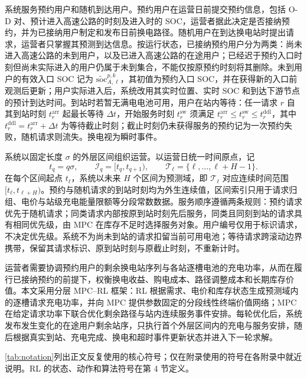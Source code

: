 \documentclass[12pt,a4paper,UTF8]{ctexart}
\begin{document}
系统服务预约用户和随机到达用户。预约用户在运营日前提交预约信息，包括 O-D 对、预计进入高速公路的时刻及进入时的 SOC，运营者据此决定是否接纳预约，并为已接纳用户制定和发布日前换电路径。随机用户在到达换电站时提出请求，运营者只掌握其预测到达信息。按运行状态，已接纳预约用户分为两类：尚未进入高速公路的未到用户，以及已进入高速公路的在途用户；已经迟于预约入口时刻但尚未实际进入的用户仍属于未到集合，不能仅按原预约时刻将其删除。未到用户的有效入口 SOC 记为 $\widetilde{\mathrm{soc}}_{A,\ell}^{p,k}$，其初值为预约入口 SOC，并在获得新的入口前观测后更新；用户实际进入后，系统改用其实时位置、实时 SOC 和到达下游节点的预计到达时间。到站时若暂无满电电池可用，用户在站内等待：任一请求 $r$ 自其到站时刻 $t_r^{\mathrm{arr}}$ 起最长等待 $\Delta t$，开始服务时刻 $t_r^{\mathrm{sw}}$ 须满足 $t_r^{\mathrm{arr}}\le t_r^{\mathrm{sw}}\le t_r^{\mathrm{ddl}}$，其中 $t_r^{\mathrm{ddl}}=t_r^{\mathrm{arr}}+\Delta t$ 为等待截止时刻；截止时刻仍未获得服务的预约记为一次预约失败，随机请求则流失。换电视为瞬时事件。

系统以固定长度 $\sigma$ 的外层区间组织运营。以运营日统一时间原点，记
\[
t_q=q\sigma,
\qquad
\mathcal I_q=[t_q,t_{q+1}),
\qquad
\mathcal T_\ell=\{\ell,\ldots,\ell+H-1\}.
\]
在每个区间起点 $t_\ell$，系统以未来 $H$ 个区间为预测域，即 $\mathcal T_\ell$ 对应连续时间范围 $[t_\ell,t_{\ell+H})$。预约与随机请求的到站时刻均为外生连续值，区间索引只用于请求归组、电价与站级充电能量限额等分段常数数据。服务顺序遵循两条规则：预约请求优先于随机请求；同类请求内部按原到站时刻先后服务，同类且同刻到站的请求具有相同优先级，由 MPC 在库存不足时选择服务对象。用户编号仅用于标识请求，不决定优先级。系统不为尚未到站的请求扣留当前可用电池；等待请求跨滚动边界携带，保留其请求标识、原到站时刻与原截止时刻，不重新计时。

运营者需要协调预约用户的剩余换电站序列与各站逐槽电池的充电功率，从而在履行已接纳预约的前提下，权衡换电收益、购电成本、路径调整成本和长期库存价值。本文采用分层 MPC--RL 框架：RL 根据需求、电价和库存状态生成预测域内的逐槽请求充电功率，并向 MPC 提供参数固定的分段线性终端价值网络；MPC 在给定请求功率下联合优化剩余路径与站内连续服务事件安排。每轮优化后，系统发布发生变化的在途用户剩余站序，只执行首个外层区间内的充电与服务安排，随后根据真实到站、充电完成、换电和超时事件更新状态并进入下一轮求解。

\autoref{tab:notation}列出正文反复使用的核心符号；仅在附录使用的符号在各附录中就近说明。RL 的状态、动作和算法符号在第 4 节定义。
\end{document}
